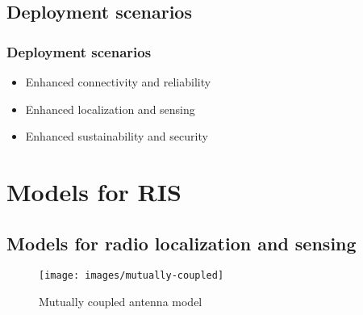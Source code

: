 \documentclass{beamer}
\let\olditem\item
\renewcommand\item{\olditem\justifying}
\begin{document}
\subsection{Deployment scenarios}
\begin{frame}
	\frametitle{Deployment scenarios}
	
	\begin{itemize}\setlength\itemsep{1.5em}
		\item Enhanced connectivity and reliability
		\item Enhanced localization and sensing
		\item Enhanced sustainability and security
	\end{itemize}
\end{frame}


\section{Models for RIS}

\subsection{Models for radio localization and sensing}


\begin{frame}
	\supercite{gradoni2020endtoendmutualcouplingaware}
	
	\begin{figure}
		\centering
		\texttt{[image: images/mutually-coupled]}
		\caption{Mutually coupled antenna model}
		\label{fig:mutually-coupled}
	\end{figure}
\end{frame}
\end{document}
